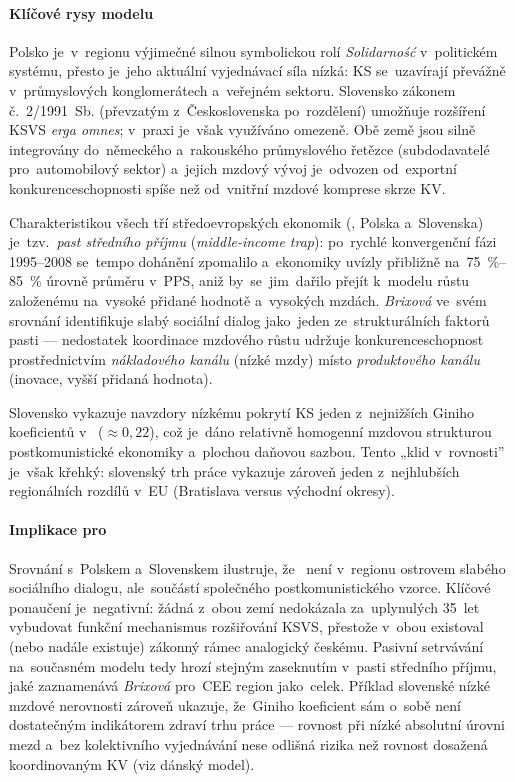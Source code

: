 \paragraph{Klíčové rysy modelu}\label{par:plsk_rysy}
Polsko je~v~regionu výjimečné silnou symbolickou rolí \textit{Solidarność}
v~politickém systému, přesto je~jeho aktuální vyjednávací síla nízká:
\acs{KS} se~uzavírají převážně v~průmyslových konglomerátech a~veřejném
sektoru. Slovensko zákonem č.~2/1991~Sb. (převzatým z~Československa
po~rozdělení) umožňuje rozšíření \acs{KSVS} \emph{erga omnes}; v~praxi je~však
využíváno omezeně. Obě země jsou silně integrovány do~německého a~rakouského
průmyslového řetězce (subdodavatelé pro~automobilový sektor) a~jejich
mzdový vývoj je~odvozen od~exportní konkurenceschopnosti spíše než
od~vnitřní mzdové komprese skrze \acs{KV}.~\cite{Brixova_MICT_CEE_2026}

Charakteristikou všech tří středoevropských ekonomik (, Polska a~Slovenska)
je~tzv.~\emph{past středního příjmu} (\textit{middle-income trap}):
po~rychlé konvergenční fázi 1995--2008 se~tempo dohánění  zpomalilo
a~ekonomiky uvízly přibližně na~\SI{75}{\percent}--\SI{85}{\percent} úrovně
 průměru  v~\acs{PPS}, aniž by~se~jim~dařilo přejít k~modelu
růstu založenému na~vysoké přidané hodnotě a~vysokých
mzdách. \textit{Brixová} ve~svém srovnání
identifikuje slabý sociální dialog jako~jeden ze~strukturálních faktorů
pasti --- nedostatek koordinace mzdového růstu udržuje konkurenceschopnost
prostřednictvím \emph{nákladového kanálu} (nízké mzdy) místo \emph{produktového
kanálu} (inovace, vyšší přidaná hodnota).~\cite{Brixova_MICT_CEE_2026}

Slovensko vykazuje navzdory nízkému pokrytí \acs{KS} jeden z~nejnižších
Giniho koeficientů v~ ($\approx 0{,}22$), což je~dáno relativně
homogenní mzdovou strukturou postkomunistické ekonomiky a~plochou daňovou
sazbou. Tento „klid v~rovnosti” je~však křehký: slovenský trh práce vykazuje
zároveň jeden z~nejhlubších regionálních rozdílů v~\acs{EU} (Bratislava versus
východní okresy).~\cite{Eurofound_KeyDimensionsIR_2023}

\paragraph{Implikace pro~}\label{par:plsk_implikace}
Srovnání s~Polskem a~Slovenskem ilustruje, že~ není v~regionu
ostrovem slabého sociálního dialogu, ale~součástí společného postkomunistického
vzorce. Klíčové ponaučení je~negativní: žádná z~obou zemí nedokázala
za~uplynulých 35~let vybudovat funkční mechanismus rozšiřování \acs{KSVS},
přestože v~obou existoval (nebo nadále existuje) zákonný rámec analogický
českému. Pasivní setrvávání na~současném modelu tedy hrozí stejným
zaseknutím v~pasti středního příjmu, jaké zaznamenává \textit{Brixová}
pro~CEE region jako~celek. Příklad slovenské
nízké mzdové nerovnosti zároveň ukazuje, že~Giniho koeficient sám o~sobě
není dostatečným indikátorem zdraví trhu práce --- rovnost při nízké
absolutní úrovni mezd a~bez kolektivního vyjednávání nese odlišná rizika
než rovnost dosažená koordinovaným \acs{KV} (viz dánský model).~\cite{Brixova_MICT_CEE_2026}
